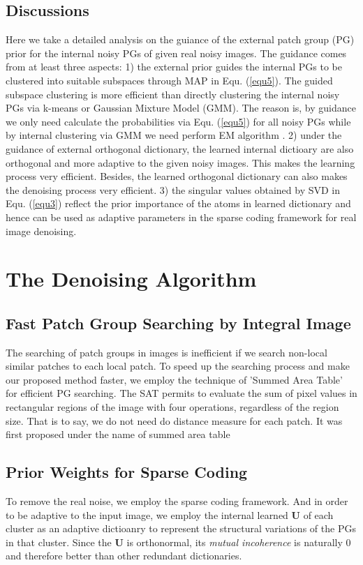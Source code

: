 \documentclass[10pt,twocolumn,letterpaper]{article}
\begin{document}
\subsection{Discussions}

Here we take a detailed analysis on the guiance of the external patch group (PG) prior for the internal noisy PGs of given real noisy images. The guidance comes from at least three aspects: 1) the external prior guides the internal PGs to be clustered into suitable subspaces through MAP in Equ. (\ref{equ5}). The guided subspace clustering is more efficient than directly clustering the internal noisy PGs via k-means or Gaussian Mixture Model (GMM). The reason is, by guidance we only need calculate the probabilities via Equ. (\ref{equ5}) for all noisy PGs while by internal clustering via GMM we need perform EM algorithm \cite{em}. 2) under the guidance of external orthogonal dictionary, the learned internal dictioary are also orthogonal and more adaptive to the given noisy images. This makes the learning process very efficient. Besides, the learned orthogonal dictionary can also makes the denoising process very efficient. 3) the singular values obtained by SVD in Equ. (\ref{equ3}) reflect the prior importance of the atoms in learned dictionary and hence can be used as adaptive parameters in the sparse coding framework for real image denoising.

\section{The Denoising Algorithm}
\subsection{Fast Patch Group Searching by Integral Image}

The searching of patch groups in images is inefficient if we search non-local similar patches to each local patch. To speed up the searching process and make our proposed method faster, we employ the technique of 'Summed Area Table' \cite{sat} for efficient PG searching. The SAT permits to evaluate the sum of pixel values in rectangular regions of the image with four operations, regardless of the region size. That is to say, we do not need do distance measure for each patch. It was first proposed under the name of summed area table\cite{viola2004robust}

\subsection{Prior Weights for Sparse Coding}
To remove the real noise, we employ the sparse coding framework. And in order to be adaptive to the input image, we employ the internal learned $\mathbf{U}$ of each cluster as an adaptive dictioanry to represent the structural variations of the PGs in that cluster. Since the $\mathbf{U}$ is orthonormal, its \emph{mutual incoherence} is naturally $0$ and therefore better than other redundant dictionaries. 
\end{document}
